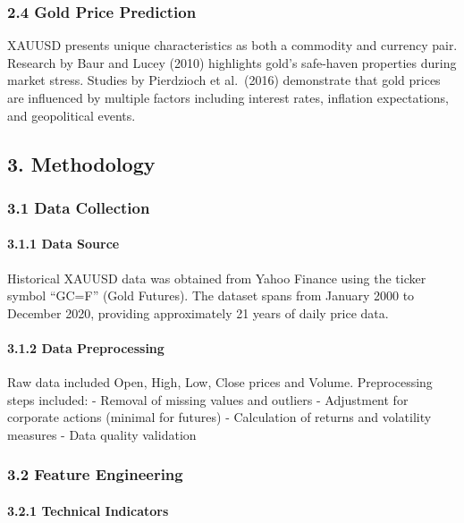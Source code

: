 \subsubsection{2.4 Gold Price Prediction}\label{gold-price-prediction}

XAUUSD presents unique characteristics as both a commodity and currency
pair. Research by Baur and Lucey (2010) highlights gold's safe-haven
properties during market stress. Studies by Pierdzioch et al.~(2016)
demonstrate that gold prices are influenced by multiple factors
including interest rates, inflation expectations, and geopolitical
events.

\subsection{3. Methodology}\label{methodology}

\subsubsection{3.1 Data Collection}\label{data-collection}

\paragraph{3.1.1 Data Source}\label{data-source}

Historical XAUUSD data was obtained from Yahoo Finance using the ticker
symbol ``GC=F'' (Gold Futures). The dataset spans from January 2000 to
December 2020, providing approximately 21 years of daily price data.

\paragraph{3.1.2 Data Preprocessing}\label{data-preprocessing}

Raw data included Open, High, Low, Close prices and Volume.
Preprocessing steps included: - Removal of missing values and outliers -
Adjustment for corporate actions (minimal for futures) - Calculation of
returns and volatility measures - Data quality validation

\subsubsection{3.2 Feature Engineering}\label{feature-engineering}

\paragraph{3.2.1 Technical Indicators}\label{technical-indicators}

